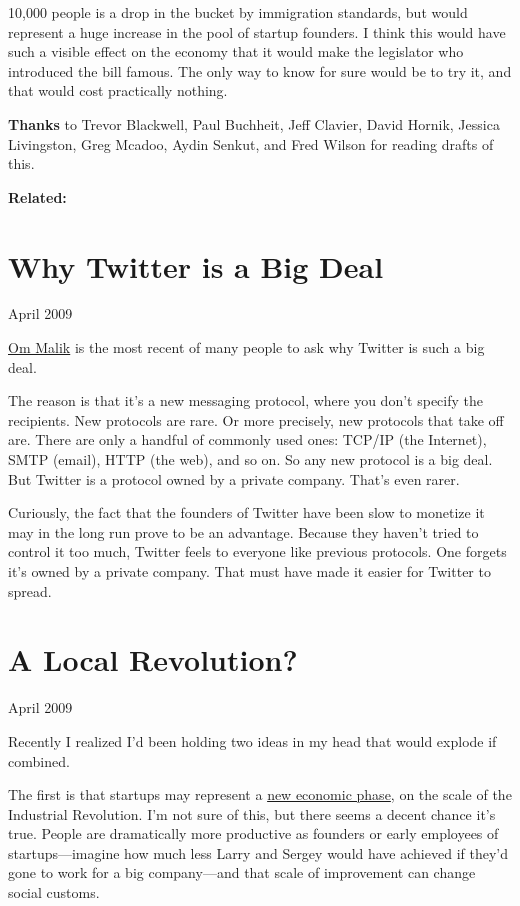 \documentclass[12pt]{book}
\begin{document}
10,000 people is a drop in the bucket by immigration standards, but
would represent a huge increase in the pool of startup founders. I think
this would have such a visible effect on the economy that it would make
the legislator who introduced the bill famous. The only way to know for
sure would be to try it, and that would cost practically nothing.

\textbf{Thanks} to Trevor Blackwell, Paul Buchheit, Jeff Clavier, David
Hornik, Jessica Livingston, Greg Mcadoo, Aydin Senkut, and Fred Wilson
for reading drafts of this.

\textbf{Related:}
\chapter{Why Twitter is a Big Deal}

April 2009

\href{http://gigaom.com/2009/04/03/google-may-buy-twitter-or-not-but-why-is-twitter-so-hot/}{Om
Malik} is the most recent of many people to ask why Twitter is such a
big deal.

The reason is that it's a new messaging protocol, where you don't
specify the recipients. New protocols are rare. Or more precisely, new
protocols that take off are. There are only a handful of commonly used
ones: TCP/IP (the Internet), SMTP (email), HTTP (the web), and so on. So
any new protocol is a big deal. But Twitter is a protocol owned by a
private company. That's even rarer.

Curiously, the fact that the founders of Twitter have been slow to
monetize it may in the long run prove to be an advantage. Because they
haven't tried to control it too much, Twitter feels to everyone like
previous protocols. One forgets it's owned by a private company. That
must have made it easier for Twitter to spread.
\chapter{A Local Revolution?}

April 2009

Recently I realized I'd been holding two ideas in my head that would
explode if combined.

The first is that startups may represent a \href{highres.html}{new
economic phase}, on the scale of the Industrial Revolution. I'm not sure
of this, but there seems a decent chance it's true. People are
dramatically more productive as founders or early employees of
startups---imagine how much less Larry and Sergey would have achieved if
they'd gone to work for a big company---and that scale of improvement
can change social customs.
\end{document}
